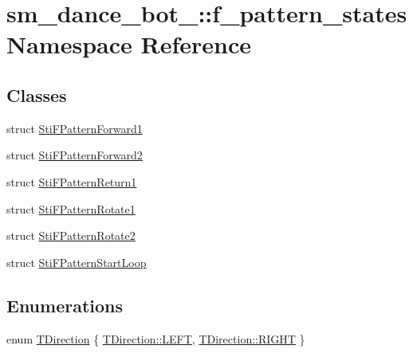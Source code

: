 \hypertarget{namespacesm__dance__bot__2_1_1f__pattern__states}{}\section{sm\+\_\+dance\+\_\+bot\+\_\+:\+:f\+\_\+pattern\+\_\+states Namespace Reference}
\label{namespacesm__dance__bot__2_1_1f__pattern__states}
\subsection*{Classes}
\begin{DoxyCompactItemize}
\item 
struct \hyperlink{classsm__dance__bot__2_1_1f__pattern__states_1_1StiFPatternForward1}{Sti\+F\+Pattern\+Forward1}
\item 
struct \hyperlink{classsm__dance__bot__2_1_1f__pattern__states_1_1StiFPatternForward2}{Sti\+F\+Pattern\+Forward2}
\item 
struct \hyperlink{classsm__dance__bot__2_1_1f__pattern__states_1_1StiFPatternReturn1}{Sti\+F\+Pattern\+Return1}
\item 
struct \hyperlink{classsm__dance__bot__2_1_1f__pattern__states_1_1StiFPatternRotate1}{Sti\+F\+Pattern\+Rotate1}
\item 
struct \hyperlink{classsm__dance__bot__2_1_1f__pattern__states_1_1StiFPatternRotate2}{Sti\+F\+Pattern\+Rotate2}
\item 
struct \hyperlink{classsm__dance__bot__2_1_1f__pattern__states_1_1StiFPatternStartLoop}{Sti\+F\+Pattern\+Start\+Loop}
\end{DoxyCompactItemize}
\subsection*{Enumerations}
\begin{DoxyCompactItemize}
\item 
enum \hyperlink{namespacesm__dance__bot__2_1_1f__pattern__states_ac1628c8b0522595fb6eb11d14875bcec}{T\+Direction} \{ \hyperlink{namespacesm__dance__bot__2_1_1f__pattern__states_ac1628c8b0522595fb6eb11d14875bceca684d325a7303f52e64011467ff5c5758}{T\+Direction\+::\+L\+E\+FT}, 
\hyperlink{namespacesm__dance__bot__2_1_1f__pattern__states_ac1628c8b0522595fb6eb11d14875bceca21507b40c80068eda19865706fdc2403}{T\+Direction\+::\+R\+I\+G\+HT}
 \}
\end{DoxyCompactItemize}


